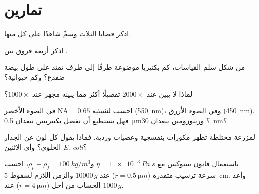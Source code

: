 \section{تمارين}

\begin{exercise}[$\star$]\label{exo:b1:cell-unit-of-life:1}
اذكر قضايا  الثلاث وسمِّ شاهدًا على كل منها.
\end{exercise}

\begin{exercise}[$\star$]\label{exo:b1:cell-unit-of-life:2}
اذكر أربعة فروق بين  .
\end{exercise}

\begin{exercise}[$\star$]\label{exo:b1:cell-unit-of-life:3}
من شكل سلم القياسات، كم بكتيريا موضوعة طرفًا إلى طرف تمتد على طول
بيضة ضفدع؟ وكم  حيوانية؟
\end{exercise}

\begin{exercise}[$\star$]\label{exo:b1:cell-unit-of-life:4}
لماذا لا يبين  عند $2000\times$ تفصيلًا أكثر مما يبينه
مجهر عند $1000\times$؟
\end{exercise}

\begin{exercise}[$\star\star$]\label{exo:b1:cell-unit-of-life:5}
احسب  لشيئية $\mathrm{NA} = 0.65$ في الضوء الأخضر
(\qty{550}{nm})، وفي الضوء الأزرق (\qty{450}{nm}). فهل تستطيع أن
تفصل بكتيريتين تبعدان \qty{0.5}{\micro m}؟ وريبوزومين يبعدان
\qty{30}{nm}؟
\end{exercise}

\begin{exercise}[$\star\star$]\label{exo:b1:cell-unit-of-life:6}
 لمزرعة مختلطة تظهر مكورات بنفسجية وعصيات وردية. فماذا يقول
كل لون عن الجدار الخلوي؟ وأي الاثنين \emph{E. coli}؟
\end{exercise}

\begin{exercise}[$\star\star$]\label{exo:b1:cell-unit-of-life:7}
باستعمال قانون ستوكس مع $\eta = \qty{1e-3}{Pa.s}$
و$\rho_p - \rho_f =
\qty{100}{kg/m^3}$، احسب سرعة ترسيب متقدرة
($r = \qty{0.5}{\micro m}$) عند $\num{10000}\,g$ والزمن اللازم
لسقوط \qty{5}{cm}. وأعد الحساب من أجل 
($r = \qty{4}{\micro m}$) عند $1000\,g$.
\end{exercise}

